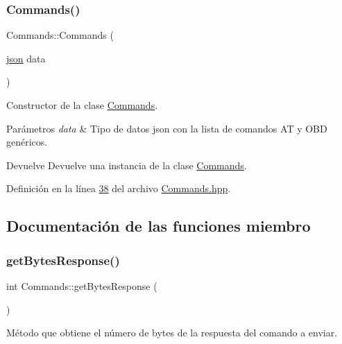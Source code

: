 \subsubsection{\texorpdfstring{Commands()}{Commands()}}
{\footnotesize\ttfamily Commands\+::\+Commands (\begin{DoxyParamCaption}\item[{\hyperlink{Commands_8hpp_ab701e3ac61a85b337ec5c1abaad6742d}{json}}]{data }\end{DoxyParamCaption})\hspace{0.3cm}{\ttfamily [inline]}}



Constructor de la clase \hyperlink{classCommands}{Commands}. 


\begin{DoxyParams}{Parámetros}
{\em data} & Tipo de datos json con la lista de comandos AT y O\+BD genéricos. \\
\hline
\end{DoxyParams}
\begin{DoxyReturn}{Devuelve}
Devuelve una instancia de la clase \hyperlink{classCommands}{Commands}. 
\end{DoxyReturn}


Definición en la línea \hyperlink{Commands_8hpp_source_l00038}{38} del archivo \hyperlink{Commands_8hpp_source}{Commands.\+hpp}.



\subsection{Documentación de las funciones miembro}
\mbox{\label{classCommands_a9b3d961dbebbd25f141d18cd5a267738}} 
\subsubsection{\texorpdfstring{get\+Bytes\+Response()}{getBytesResponse()}}
{\footnotesize\ttfamily int Commands\+::get\+Bytes\+Response (\begin{DoxyParamCaption}{ }\end{DoxyParamCaption})\hspace{0.3cm}{\ttfamily [inline]}}



Método que obtiene el número de bytes de la respuesta del comando a enviar. 

